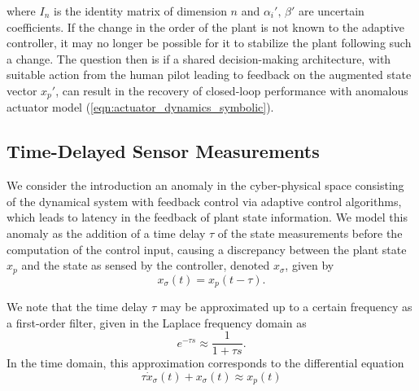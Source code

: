 where $I_n$ is the identity matrix of dimension $n$ and $\alpha_i', \, \beta'$ are uncertain coefficients. If the change in the order of the plant is not known to the adaptive controller, it may no longer be possible for it to stabilize the plant following such a change. The question then is if a shared decision-making architecture, with suitable action from the human pilot leading to feedback on the augmented state vector $x_p'$, can result in the recovery of closed-loop performance with anomalous actuator model (\ref{eqn:actuator_dynamics_symbolic}).

\subsection{Time-Delayed Sensor Measurements} \label{subsec:siso_delay}
We consider the introduction an anomaly in the cyber-physical space consisting of the dynamical system with feedback control via adaptive control algorithms, which leads to latency in the feedback of plant state information. We model this anomaly as the addition of a time delay $\tau$ of the state measurements before the computation of the control input, causing a discrepancy between the plant state $x_p$ and the state as sensed by the controller, denoted $x_\sigma$, given by
\begin{equation}
	x_\sigma(t) = x_p(t - \tau). \label{eqn:delay_diffeq}
\end{equation}

We note that the time delay $\tau$ may be approximated up to a certain frequency as a first-order filter, given in the Laplace frequency domain as
\begin{equation}
	e^{-\tau s} \approx \frac{1}{1 + \tau s}.
\end{equation}
In the time domain, this approximation corresponds to the differential equation
\begin{equation}
	\tau \dot{x}_{\sigma}(t) + x_{\sigma}(t) \approx x_p(t)	\label{eqn:delay_approx_diffeq}
\end{equation}

